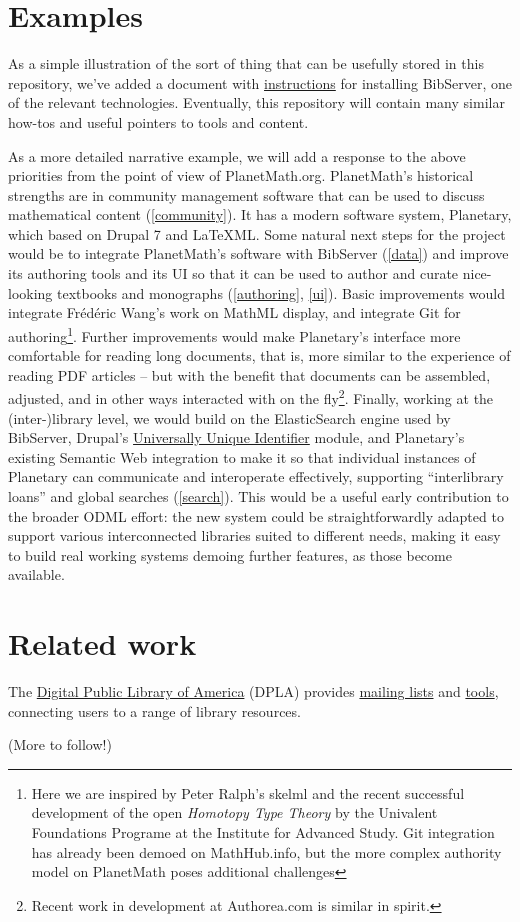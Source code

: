 \documentclass{article}
\begin{document}
\section{Examples}

As a simple illustration of the sort of thing that can be usefully stored in this repository, we've added a document with \href{http://holtzermann17.github.io/skelodml/bibserver-setup.html}{instructions} for installing BibServer, one of the relevant technologies.  Eventually, this repository will contain many similar how-tos and useful pointers to tools and content.

As a more detailed narrative example, we will add a response to the above priorities from the point of view of PlanetMath.org.  PlanetMath's historical strengths are in community management software that can be used to discuss mathematical content (\ref{community}).  It has a modern software system, Planetary, which based on Drupal 7 and LaTeXML.  Some natural next steps for the project would be to integrate PlanetMath's software with BibServer (\ref{data}) and improve its authoring tools and its UI so that it can be used to author and curate nice-looking textbooks and monographs (\ref{authoring}, \ref{ui}).  Basic improvements would integrate Fr\'ed\'eric Wang's work on MathML display, and integrate Git for authoring\footnote{Here we are inspired by  Peter Ralph's skelml and the recent successful development of the open \emph{Homotopy Type Theory} by the Univalent Foundations Programe at the Institute for Advanced Study.  Git integration has already been demoed on MathHub.info, but the more complex authority model on PlanetMath poses additional challenges}.  Further improvements would make Planetary's interface more comfortable for reading long documents, that is, more similar to the experience of reading PDF articles -- but with the benefit that documents can be assembled, adjusted, and in other ways interacted with on the fly\footnote{Recent work in development at Authorea.com is similar in spirit.}.  Finally, working at the (inter-)library level, we would build on the ElasticSearch engine used by BibServer, Drupal's \href{https://www.drupal.org/project/uuid}{Universally Unique Identifier} module, and Planetary's existing Semantic Web integration to make it so that individual instances of Planetary can communicate and interoperate effectively, supporting ``interlibrary loans'' and global searches (\ref{search}).  This would be a useful early contribution to the broader ODML effort: the new system could be straightforwardly adapted to support various interconnected libraries suited to different needs, making it easy to build real working systems demoing further features, as those become available.

\section{Related work}

The \href{http://dp.la/info/}{Digital Public Library of America} (DPLA) provides \href{https://lists.dp.la/listinfo}{mailing lists} and \href{http://dp.la/apps}{tools}, connecting users to a range of library resources.

(More to follow!)
\end{document}
